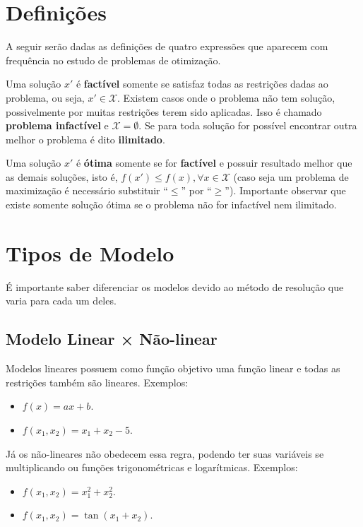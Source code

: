 \section{Definições}\label{sec:definicoes}

A seguir serão dadas as definições de quatro expressões que aparecem com frequência no estudo de problemas de otimização.

Uma solução $x'$ é \textbf{factível} somente se satisfaz todas as restrições dadas ao problema, ou seja, $x' \in \mathcal{X}$.
Existem casos onde o problema não tem solução, possivelmente por muitas restrições terem sido aplicadas.
Isso é chamado \textbf{problema infactível} e $\mathcal{X} = \emptyset$.
Se para toda solução for possível encontrar outra melhor o problema é dito \textbf{ilimitado}.

Uma solução $x'$ é \textbf{ótima} somente se for \textbf{factível} e possuir resultado melhor que as demais soluções, isto é, $f(x') \le f(x), \forall x \in \mathcal{X}$ (caso seja um problema de maximização é necessário substituir “$\le$” por “$\ge$”).
Importante observar que existe somente solução ótima se o problema não for infactível nem ilimitado.


\section{Tipos de Modelo}\label{sec:tipos-de-modelo}

É importante saber diferenciar os modelos devido ao método de resolução que varia para cada um deles.

\subsection{Modelo Linear × Não-linear}\label{subsec:modelo-linear}


Modelos lineares possuem como função objetivo uma função linear e todas as restrições também são lineares.
Exemplos:

\begin{itemize}
    \item $f(x) = ax + b$.
    \item $f(x_1, x_2) = x_1 + x_2 - 5$.
\end{itemize}

Já os não-lineares não obedecem essa regra, podendo ter suas variáveis se multiplicando ou funções trigonométricas e logarítmicas.
Exemplos:

\begin{itemize}
    \item $f(x_1, x_2) = x_1^2 + x_2^2$.
    \item $f(x_1, x_2) = \tan(x_1 + x_2)$.
\end{itemize}

